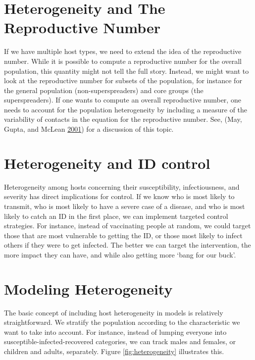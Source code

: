 \documentclass[]{book}
\theoremstyle{definition}
\theoremstyle{definition}
\theoremstyle{definition}
\theoremstyle{remark}
\begin{document}
\section{Heterogeneity and The Reproductive
Number}\label{heterogeneity-and-the-reproductive-number}

If we have multiple host types, we need to extend the idea of the
reproductive number. While it is possible to compute a reproductive
number for the overall population, this quantity might not tell the full
story. Instead, we might want to look at the reproductive number for
subsets of the population, for instance for the general population
(non-superspreaders) and core groups (the superspreaders). If one wants
to compute an overall reproductive number, one needs to account for the
population heterogeneity by including a measure of the variability of
contacts in the equation for the reproductive number. See, (May, Gupta,
and McLean \protect\hyperlink{ref-may01}{2001}) for a discussion of this
topic.

\section{Heterogeneity and ID
control}\label{heterogeneity-and-id-control}

Heterogeneity among hosts concerning their susceptibility,
infectiousness, and severity has direct implications for control. If we
know who is most likely to transmit, who is most likely to have a severe
case of a disease, and who is most likely to catch an ID in the first
place, we can implement targeted control strategies. For instance,
instead of vaccinating people at random, we could target those that are
most vulnerable to getting the ID, or those most likely to infect others
if they were to get infected. The better we can target the intervention,
the more impact they can have, and while also getting more `bang for our
buck'.

\section{Modeling Heterogeneity}\label{modeling-heterogeneity}

The basic concept of including host heterogeneity in models is
relatively straightforward. We stratify the population according to the
characteristic we want to take into account. For instance, instead of
lumping everyone into susceptible-infected-recovered categories, we can
track males and females, or children and adults, separately. Figure
\ref{fig:heterogeneity} illustrates this.
\end{document}
